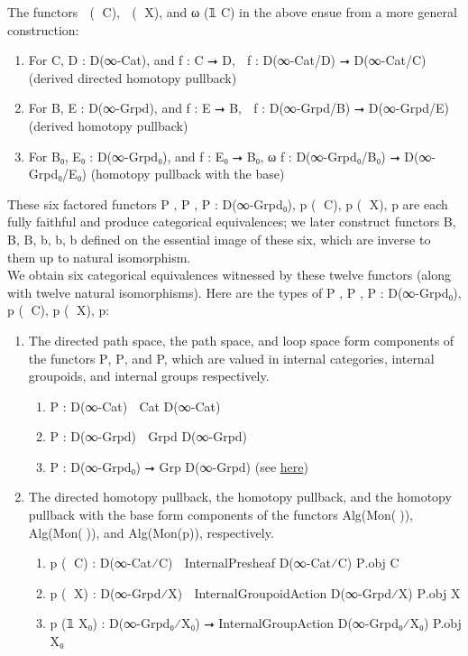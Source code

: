\documentclass{book}
\theoremstyle{definition}
\begin{document}
The functors ω⃗ (𝟙 C), ω⃡ (𝟙 X), and ω (𝟙 C) in the above ensue from a more general construction:\\

\begin{enumerate}
\item For C, D : D(∞-Cat), and f : C ⭢ D, ω⃗ f : D(∞-Cat/D) ⭢ D(∞-Cat/C)   (derived directed homotopy pullback)
\item For B, E : D(∞-Grpd), and f : E ⭢ B, ω⃡ f : D(∞-Grpd/B) ⭢ D(∞-Grpd/E) (derived homotopy pullback)
\item For B₀, E₀ : D(∞-Grpd₀), and f : E₀ ⭢ B₀, ω f : D(∞-Grpd₀/B₀) ⭢ D(∞-Grpd₀/E₀) (homotopy pullback with the base)
\end{enumerate}

These six factored functors P⃗ , P⃡ , P : D(∞-Grpd₀), p⃗ (𝟙 C), p⃡ (𝟙 X), p are each fully faithful and produce categorical equivalences; we later construct functors B⃗, B⃡, B, b⃗, b⃡, b defined on the essential image of these six, which are inverse to them up to natural isomorphism.\\

We obtain six categorical equivalences witnessed by these twelve functors (along with twelve natural isomorphisms). Here are the types of P⃗ , P⃡ , P : D(∞-Grpd₀), p⃗ (𝟙 C), p⃡ (𝟙 X), p:

\begin{enumerate}
\item The directed path space, the path space, and loop space form components of the functors P⃗, P⃡, and P, which are valued in internal categories, internal groupoids, and internal groups respectively.
\begin{enumerate}
\item P⃗ : D(∞-Cat) ⭢ Cat D(∞-Cat)
\item P⃡ : D(∞-Grpd) ⭢ Grpd D(∞-Grpd)
\item P : D(∞-Grpd₀) ⭢ Grp D(∞-Grpd) (see \href{https://mathoverflow.net/questions/128883/why-omega-x-and-bg-are-adjoint-functors}{here})
\end{enumerate}
\item The directed homotopy pullback, the homotopy pullback, and the homotopy pullback with the base form components of the functors Alg(Mon(ω⃗)), Alg(Mon(ω⃡)), and Alg(Mon(p)), respectively. 
\begin{enumerate}
\item p⃗ (𝟙 C) : D(∞-Cat⁄C) ⭢ InternalPresheaf D(∞-Cat⁄C) P⃗.obj C 
\item p⃡ (𝟙 X) : D(∞-Grpd⁄X) ⭢ InternalGroupoidAction D(∞-Grpd⁄X) P⃡.obj X
\item p (𝟙 X₀) : D(∞-Grpd₀⁄X₀) ⭢ InternalGroupAction D(∞-Grpd₀⁄X₀) P.obj X₀
\end{enumerate}
\end{enumerate}
\end{document}
